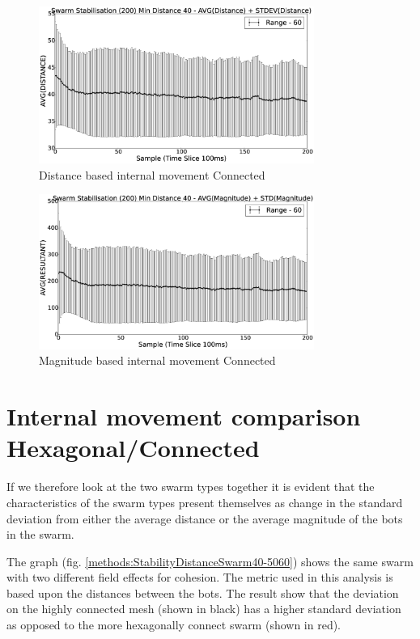 \documentclass[10pt,journal,letterpaper,twoside]{IEEEtran}
\newcommand{\swarmA}{Hexagonal}
\newcommand{\swarmB}{Connected}
\newcommand{\stability}{internal movement}
\newcommand{\Stability}{Internal movement}
\newcommand{\Fig}{fig.}
\begin{document}
\begin{figure}[H]
\begin{center}
\includegraphics[width=9cm]{figures/StabilityDistanceSwarm40-60}
\end{center}
\caption{Distance based \stability{} \swarmB{}\label{methods:StabilityDistanceSwarm40-60}}
\end{figure}

\begin{figure}[H]
\begin{center}
\includegraphics[width=9cm]{figures/StabilityMagnitudeSwarm40-60}
\end{center}
\caption{Magnitude based \stability{} \swarmB{}\label{methods:StabilityMagnitudeSwarm40-60}}
\end{figure}

\section{\Stability{} comparison \swarmA{}/\swarmB{}\label{section:stabilityComparison}}

If we therefore look at the two swarm types together it is evident that the characteristics of the swarm types present themselves as change in the standard deviation from either the average distance or the average magnitude of the bots in the swarm.

The graph (\Fig{} \ref{methods:StabilityDistanceSwarm40-5060}) shows the same swarm with two different field effects for cohesion. The metric used in this analysis is based upon the distances between the bots. The result show that the deviation on the highly connected mesh (shown in black) has a higher standard deviation as opposed to the more hexagonally connect swarm (shown in red).
\end{document}

